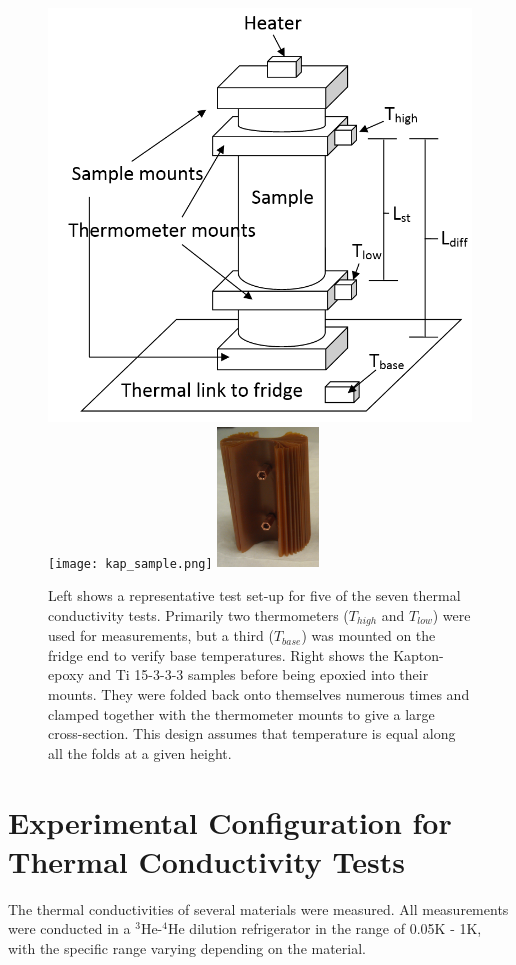\documentclass[final]{svjour2}
\begin{document}
\begin{figure}[h]
\centering
\includegraphics[width = .4\textwidth]{Rep_test_sample.png}
\qquad
\texttt{[image: kap\_sample.png]}
\includegraphics[width = 0.24\textwidth]{kap_side.png}

\caption{{\small Left shows a representative test set-up for five of the seven thermal conductivity tests. Primarily two thermometers ($T_{high}$ and $T_{low}$) were used for measurements, but a third ($T_{base}$) was mounted on the fridge end to verify base temperatures. Right shows the Kapton-epoxy and Ti 15-3-3-3 samples before being epoxied into their mounts. They were folded back onto themselves numerous times and clamped together with the thermometer mounts to give a large cross-section. This design assumes that temperature is equal along all the folds at a given height.}}
\label{setup}
\end{figure}

\section{Experimental Configuration for Thermal Conductivity Tests}
The thermal conductivities of several materials were measured. All measurements were conducted in a $^3$He-$^4$He dilution refrigerator in the range of 0.05K - 1K, with the specific range varying depending on the material.
\end{document}
